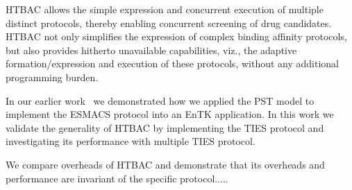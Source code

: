 HTBAC allows the simple expression and concurrent execution of multiple
distinct protocols, thereby enabling concurrent screening of drug candidates.
HTBAC not only simplifies the expression of complex binding affinity
protocols, but also provides hitherto unavailable capabilities, viz., the
adaptive formation/expression and execution of these protocols, without any
additional programming burden.

In our earlier work~\cite{dakka2017} we demonstrated how we applied the
PST model to implement the ESMACS protocol into an EnTK application. In this
work we validate the generality of HTBAC by implementing the TIES protocol and
investigating its performance with multiple TIES protocol.


We compare overheads of HTBAC and demonstrate that its overheads and
performance are invariant of the specific protocol..... 








